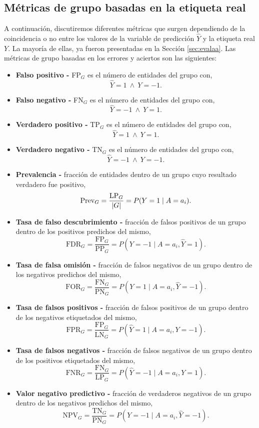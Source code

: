 \documentclass[oneside,openright,titlepage,numbers=noenddot,openany,headinclude,footinclude=true,
cleardoublepage=empty,abstractoff,BCOR=5mm,paper=a4,fontsize=12pt,main=spanish]{scrreprt}
\begin{document}
\subsection*{Métricas de grupo basadas en la etiqueta real}

A continuación, discutiremos diferentes métricas que surgen dependiendo de la coincidencia o no entre los valores de la variable de predicción $\hat{Y}$ y la etiqueta real $Y$. La mayoría de ellas, ya fueron presentadas en la Sección \ref{sec:evalaa}. Las métricas de grupo basadas en los errores y aciertos son las siguientes:

\begin{itemize} 
    \item \textbf{Falso positivo -} FP$_G$ es el número de entidades del grupo con, $$\hat{Y} = 1 \ \wedge \ Y = -1.$$
    \item \textbf{Falso negativo -} FN$_G$ es el número de entidades del grupo con, $$\hat{Y} = -1 \ \wedge \ Y = 1.$$
    \item \textbf{Verdadero positivo -} TP$_G$ es el número de entidades del grupo con, $$\hat{Y} = 1 \ \wedge \ Y = 1.$$
    \item \textbf{Verdadero negativo -} TN$_G$ es el número de entidades del grupo con, $$\hat{Y} = -1 \ \wedge \ Y = -1.$$
    \item \textbf{Prevalencia -}  fracción de entidades dentro de un grupo cuyo resultado verdadero fue positivo, $$\text{Prev}_G= \frac{\text{LP}_G}{\left\lvert G\right\rvert}=P(Y=1 \mid A=a_i).$$
    \item \textbf{Tasa de falso descubrimiento -} fracción de falsos positivos de un grupo dentro de los positivos predichos del mismo, $$\text{FDR}_G = \frac{\text{FP}_G}{\text{PP}_G} = P(Y=-1 \mid A=a_i,\hat{Y}=1).$$
    \item \textbf{Tasa de falsa omisión -} fracción de falsos negativos de un grupo dentro de los negativos predichos del mismo, $$\text{FOR}_G = \frac{\text{FN}_G}{\text{PN}_G} = P(Y=1 \mid A=a_i, \hat{Y}=-1).$$
    \item \textbf{Tasa de falsos positivos -} fracción de falsos positivos de un grupo dentro de los negativos etiquetados del mismo, $$\text{FPR}_G = \frac{\text{FP}_G}{\text{LN}_G} = P(\hat{Y}=1 \mid A=a_i,Y=-1).$$
    \item \textbf{Tasa de falsos negativos -} fracción de falsos negativos de un grupo dentro de los positivos etiquetados del mismo, $$\text{FNR}_G = \frac{\text{FN}_G}{\text{LP}_G} = P(\hat{Y}=-1 \mid A=a_i,Y=1).$$
    \item \textbf{Valor negativo predictivo -} fracción de verdaderos negativos de un grupo dentro de los negativos predichos del mismo, $$\text{NPV}_G = \frac{\text{TN}_G}{\text{PN}_G} = P(Y=-1 \mid A=a_i,\hat{Y}=-1).$$

\end{itemize}
\end{document}
